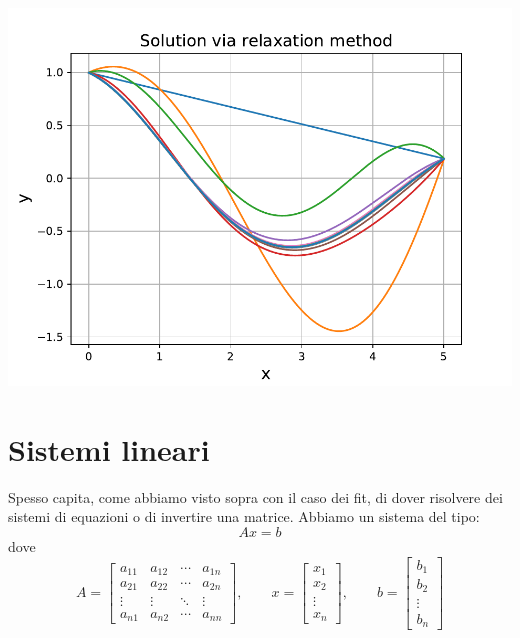 \documentclass[10pt,a4paper]{article}
\begin{document}
\begin{center}
\includegraphics[scale=0.8]{img/BVP_relax.pdf}
\end{center}




\newpage

\section{Sistemi lineari}
Spesso capita, come abbiamo visto sopra con il caso dei fit,  di dover risolvere dei sistemi di equazioni o di invertire una matrice.
Abbiamo un sistema del tipo:
\begin{equation}
A x = b
\end{equation}
dove 
\[
A = \begin{bmatrix} 
a_{11} & a_{12} & \cdots & a_{1n} \\
a_{21} & a_{22} & \cdots & a_{2n} \\
\vdots & \vdots & \ddots & \vdots \\
a_{n1} & a_{n2} & \cdots & a_{nn}
\end{bmatrix}, 
\qquad  
x = \begin{bmatrix} x_{1} \\ x_2 \\ \vdots \\ x_n \end{bmatrix} ,
\qquad
b = \begin{bmatrix} b_{1} \\ b_2 \\ \vdots \\ b_n \end{bmatrix}
\]
\end{document}
